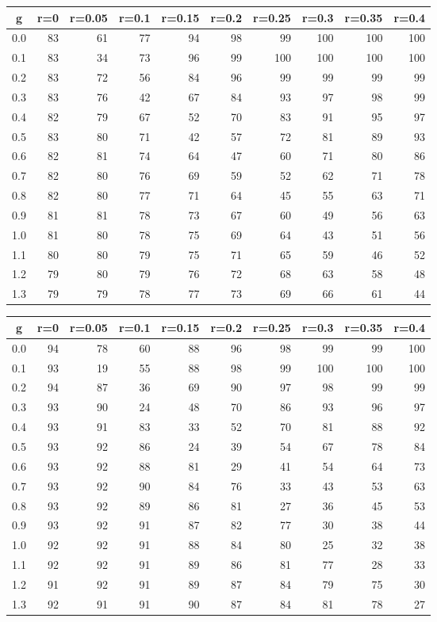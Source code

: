 %
\begin{table}[!tbp]
 \begin{center}
 \begin{tabular}{rrrrrrrrrr}\hline\hline
\multicolumn{1}{c}{g}&\multicolumn{1}{c}{r=0}&\multicolumn{1}{c}{r=0.05}&\multicolumn{1}{c}{r=0.1}&\multicolumn{1}{c}{r=0.15}&\multicolumn{1}{c}{r=0.2}&\multicolumn{1}{c}{r=0.25}&\multicolumn{1}{c}{r=0.3}&\multicolumn{1}{c}{r=0.35}&\multicolumn{1}{c}{r=0.4}\tabularnewline
\hline
0.0&83&61&77&94&98& 99&100&100&100\tabularnewline
0.1&83&34&73&96&99&100&100&100&100\tabularnewline
0.2&83&72&56&84&96& 99& 99& 99& 99\tabularnewline
0.3&83&76&42&67&84& 93& 97& 98& 99\tabularnewline
0.4&82&79&67&52&70& 83& 91& 95& 97\tabularnewline
0.5&83&80&71&42&57& 72& 81& 89& 93\tabularnewline
0.6&82&81&74&64&47& 60& 71& 80& 86\tabularnewline
0.7&82&80&76&69&59& 52& 62& 71& 78\tabularnewline
0.8&82&80&77&71&64& 45& 55& 63& 71\tabularnewline
0.9&81&81&78&73&67& 60& 49& 56& 63\tabularnewline
1.0&81&80&78&75&69& 64& 43& 51& 56\tabularnewline
1.1&80&80&79&75&71& 65& 59& 46& 52\tabularnewline
1.2&79&80&79&76&72& 68& 63& 58& 48\tabularnewline
1.3&79&79&78&77&73& 69& 66& 61& 44\tabularnewline
\hline
\end{tabular}

\end{center}

\end{table}

%
\begin{table}[!tbp]
 \begin{center}
 \begin{tabular}{rrrrrrrrrr}\hline\hline
\multicolumn{1}{c}{g}&\multicolumn{1}{c}{r=0}&\multicolumn{1}{c}{r=0.05}&\multicolumn{1}{c}{r=0.1}&\multicolumn{1}{c}{r=0.15}&\multicolumn{1}{c}{r=0.2}&\multicolumn{1}{c}{r=0.25}&\multicolumn{1}{c}{r=0.3}&\multicolumn{1}{c}{r=0.35}&\multicolumn{1}{c}{r=0.4}\tabularnewline
\hline
0.0&94&78&60&88&96&98& 99& 99&100\tabularnewline
0.1&93&19&55&88&98&99&100&100&100\tabularnewline
0.2&94&87&36&69&90&97& 98& 99& 99\tabularnewline
0.3&93&90&24&48&70&86& 93& 96& 97\tabularnewline
0.4&93&91&83&33&52&70& 81& 88& 92\tabularnewline
0.5&93&92&86&24&39&54& 67& 78& 84\tabularnewline
0.6&93&92&88&81&29&41& 54& 64& 73\tabularnewline
0.7&93&92&90&84&76&33& 43& 53& 63\tabularnewline
0.8&93&92&89&86&81&27& 36& 45& 53\tabularnewline
0.9&93&92&91&87&82&77& 30& 38& 44\tabularnewline
1.0&92&92&91&88&84&80& 25& 32& 38\tabularnewline
1.1&92&92&91&89&86&81& 77& 28& 33\tabularnewline
1.2&91&92&91&89&87&84& 79& 75& 30\tabularnewline
1.3&92&91&91&90&87&84& 81& 78& 27\tabularnewline
\hline
\end{tabular}

\end{center}

\end{table}

